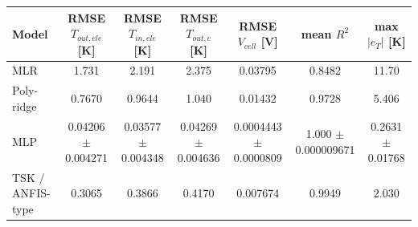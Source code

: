 \begin{tabular}{lcccccc}
\toprule
Model & RMSE $T_{out,ele}$ [K] & RMSE $T_{in,ele}$ [K] & RMSE $T_{out,c}$ [K] & RMSE $V_{cell}$ [V] & mean $R^2$ & max $|e_T|$ [K] \\
\midrule
MLR & 1.731 & 2.191 & 2.375 & 0.03795 & 0.8482 & 11.70 \\
Poly-ridge & 0.7670 & 0.9644 & 1.040 & 0.01432 & 0.9728 & 5.406 \\
MLP & 0.04206 $\pm$ 0.004271 & 0.03577 $\pm$ 0.004348 & 0.04269 $\pm$ 0.004636 & 0.0004443 $\pm$ 0.0000809 & 1.000 $\pm$ 0.000009671 & 0.2631 $\pm$ 0.01768 \\
TSK / ANFIS-type & 0.3065 & 0.3866 & 0.4170 & 0.007674 & 0.9949 & 2.030 \\
\bottomrule
\end{tabular}
